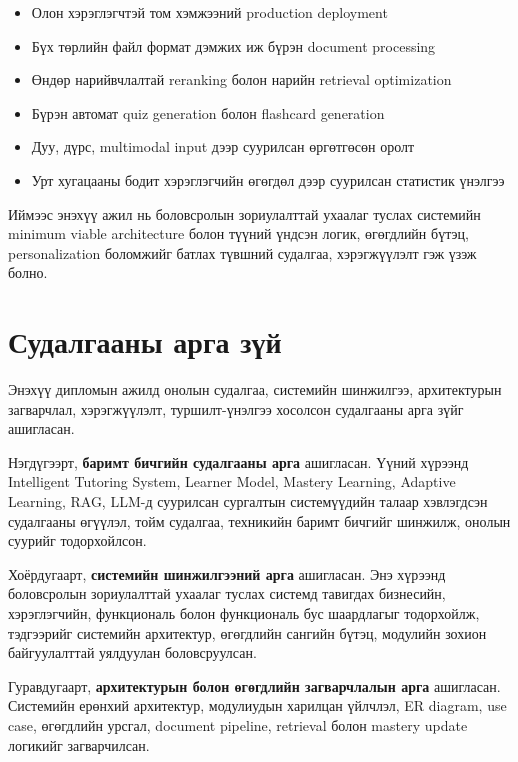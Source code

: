 \documentclass[12pt,A4]{report}
\newcommand{\eng}[1]{#1}
\begin{document}
\begin{itemize}
    \item Олон хэрэглэгчтэй том хэмжээний \eng{production deployment}
    \item Бүх төрлийн файл формат дэмжих иж бүрэн \eng{document processing}
    \item Өндөр нарийвчлалтай \eng{reranking} болон нарийн \eng{retrieval optimization}
    \item Бүрэн автомат \eng{quiz generation} болон \eng{flashcard generation}
    \item Дуу, дүрс, \eng{multimodal input} дээр суурилсан өргөтгөсөн оролт
    \item Урт хугацааны бодит хэрэглэгчийн өгөгдөл дээр суурилсан статистик үнэлгээ
\end{itemize}

Иймээс энэхүү ажил нь боловсролын зориулалттай ухаалаг туслах системийн \eng{minimum viable architecture} болон түүний үндсэн логик, өгөгдлийн бүтэц, personalization боломжийг батлах түвшний судалгаа, хэрэгжүүлэлт гэж үзэж болно.

\section*{Судалгааны арга зүй}

Энэхүү дипломын ажилд онолын судалгаа, системийн шинжилгээ, архитектурын загварчлал, хэрэгжүүлэлт, туршилт-үнэлгээ хосолсон судалгааны арга зүйг ашигласан.

Нэгдүгээрт, \textbf{баримт бичгийн судалгааны арга} ашигласан. Үүний хүрээнд \eng{Intelligent Tutoring System}, \eng{Learner Model}, \eng{Mastery Learning}, \eng{Adaptive Learning}, \eng{RAG}, \eng{LLM}-д суурилсан сургалтын системүүдийн талаар хэвлэгдсэн судалгааны өгүүлэл, тойм судалгаа, техникийн баримт бичгийг шинжилж, онолын суурийг тодорхойлсон.

Хоёрдугаарт, \textbf{системийн шинжилгээний арга} ашигласан. Энэ хүрээнд боловсролын зориулалттай ухаалаг туслах системд тавигдах бизнесийн, хэрэглэгчийн, функциональ болон функциональ бус шаардлагыг тодорхойлж, тэдгээрийг системийн архитектур, өгөгдлийн сангийн бүтэц, модулийн зохион байгуулалттай уялдуулан боловсруулсан.

Гуравдугаарт, \textbf{архитектурын болон өгөгдлийн загварчлалын арга} ашигласан. Системийн ерөнхий архитектур, модулиудын харилцан үйлчлэл, \eng{ER diagram}, \eng{use case}, өгөгдлийн урсгал, \eng{document pipeline}, retrieval болон \eng{mastery update} логикийг загварчилсан.
\end{document}
